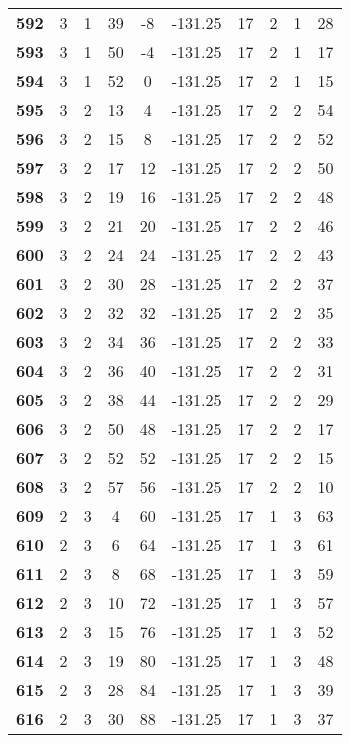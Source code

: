 \documentclass[12pt,letterpaper, onecolumn]{exam}
\begin{document}
\begin{longtable}{cccccccccc}
    \textbf{592} & 3 & 1 & 39 & -8 & -131.25 & 17 & 2 & 1 & 28 \\ 
    \textbf{593} & 3 & 1 & 50 & -4 & -131.25 & 17 & 2 & 1 & 17 \\ 
    \textbf{594} & 3 & 1 & 52 & 0 & -131.25 & 17 & 2 & 1 & 15 \\ 
    \textbf{595} & 3 & 2 & 13 & 4 & -131.25 & 17 & 2 & 2 & 54 \\ 
    \textbf{596} & 3 & 2 & 15 & 8 & -131.25 & 17 & 2 & 2 & 52 \\ 
    \textbf{597} & 3 & 2 & 17 & 12 & -131.25 & 17 & 2 & 2 & 50 \\ 
    \textbf{598} & 3 & 2 & 19 & 16 & -131.25 & 17 & 2 & 2 & 48 \\ 
    \textbf{599} & 3 & 2 & 21 & 20 & -131.25 & 17 & 2 & 2 & 46 \\ 
    \textbf{600} & 3 & 2 & 24 & 24 & -131.25 & 17 & 2 & 2 & 43 \\ 
    \textbf{601} & 3 & 2 & 30 & 28 & -131.25 & 17 & 2 & 2 & 37 \\ 
    \textbf{602} & 3 & 2 & 32 & 32 & -131.25 & 17 & 2 & 2 & 35 \\ 
    \textbf{603} & 3 & 2 & 34 & 36 & -131.25 & 17 & 2 & 2 & 33 \\ 
    \textbf{604} & 3 & 2 & 36 & 40 & -131.25 & 17 & 2 & 2 & 31 \\ 
    \textbf{605} & 3 & 2 & 38 & 44 & -131.25 & 17 & 2 & 2 & 29 \\ 
    \textbf{606} & 3 & 2 & 50 & 48 & -131.25 & 17 & 2 & 2 & 17 \\      \hline
    \textbf{607} & 3 & 2 & 52 & 52 & -131.25 & 17 & 2 & 2 & 15 \\ 
    \textbf{608} & 3 & 2 & 57 & 56 & -131.25 & 17 & 2 & 2 & 10 \\ 
    \textbf{609} & 2 & 3 & 4 & 60 & -131.25 & 17 & 1 & 3 & 63 \\ 
    \textbf{610} & 2 & 3 & 6 & 64 & -131.25 & 17 & 1 & 3 & 61 \\ 
    \textbf{611} & 2 & 3 & 8 & 68 & -131.25 & 17 & 1 & 3 & 59 \\ 
    \textbf{612} & 2 & 3 & 10 & 72 & -131.25 & 17 & 1 & 3 & 57 \\ 
    \textbf{613} & 2 & 3 & 15 & 76 & -131.25 & 17 & 1 & 3 & 52 \\ 
    \textbf{614} & 2 & 3 & 19 & 80 & -131.25 & 17 & 1 & 3 & 48 \\ 
    \textbf{615} & 2 & 3 & 28 & 84 & -131.25 & 17 & 1 & 3 & 39 \\ 
    \textbf{616} & 2 & 3 & 30 & 88 & -131.25 & 17 & 1 & 3 & 37 \\ 

\end{longtable}
\end{document}
